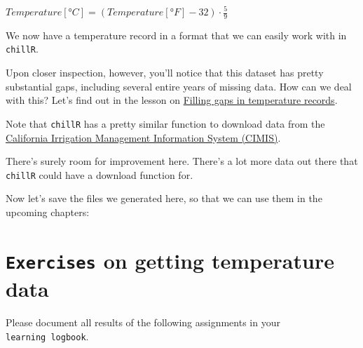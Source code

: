 \documentclass[
]{book}
\newenvironment{Shaded}{\begin{snugshade}}{\end{snugshade}}
\newcommand{\DataTypeTok}[1]{\textcolor[rgb]{0.13,0.29,0.53}{#1}}
\newcommand{\KeywordTok}[1]{\textcolor[rgb]{0.13,0.29,0.53}{\textbf{#1}}}
\newcommand{\NormalTok}[1]{#1}
\newcommand{\OperatorTok}[1]{\textcolor[rgb]{0.81,0.36,0.00}{\textbf{#1}}}
\newcommand{\OtherTok}[1]{\textcolor[rgb]{0.56,0.35,0.01}{#1}}
\newcommand{\StringTok}[1]{\textcolor[rgb]{0.31,0.60,0.02}{#1}}
\begin{document}
\(Temperature[°C]=(Temperature[°F]-32)\cdot\frac{5}{9}\)

We now have a temperature record in a format that we can easily work with in \texttt{chillR}.

Upon closer inspection, however, you'll notice that this dataset has pretty substantial gaps, including several entire years of missing data. How can we deal with this? Let's find out in the lesson on \protect\hyperlink{filling-gaps-in-temperature-records}{Filling gaps in temperature records}.

Note that \texttt{chillR} has a pretty similar function to download data from the \href{https://cimis.water.ca.gov/}{California Irrigation Management Information System (CIMIS)}.

There's surely room for improvement here. There's a lot more data out there that \texttt{chillR} could have a download function for.

Now let's save the files we generated here, so that we can use them in the upcoming chapters:

\begin{Shaded}
\end{Shaded}

\hypertarget{exercises_getting}{%
\section*{\texorpdfstring{\texttt{Exercises} on getting temperature data}{Exercises on getting temperature data}}\label{exercises_getting}}

Please document all results of the following assignments in your \texttt{learning\ logbook}.
\end{document}
